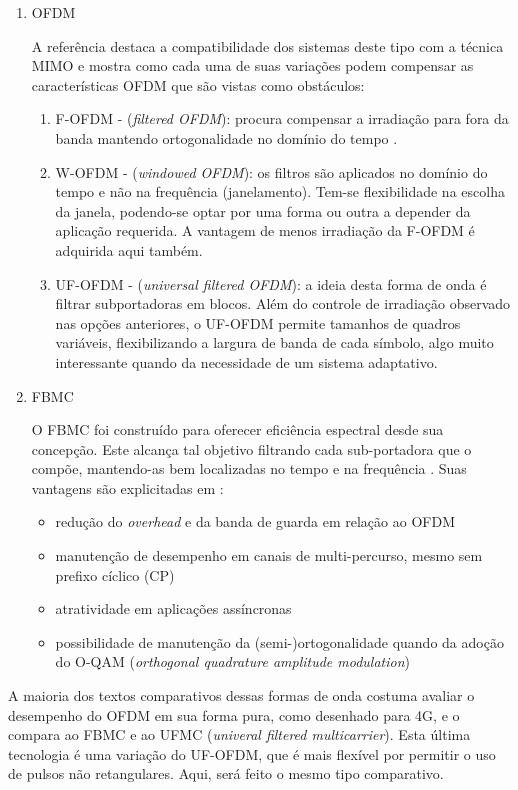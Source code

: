 \begin{enumerate}
\item{OFDM}
\par A referência \cite{Maziar} destaca a compatibilidade dos sistemas deste tipo com a técnica MIMO e mostra como cada uma de suas variações podem compensar as características OFDM que são vistas como obstáculos:
\begin{enumerate}
\item{F-OFDM} - (\textit{filtered OFDM}): procura compensar a irradiação para fora da banda mantendo ortogonalidade no domínio do tempo \cite{AbdoliJ}.
\item{W-OFDM} - (\textit{windowed OFDM}): os filtros são aplicados no domínio do tempo e não na frequência (janelamento). Tem-se flexibilidade na escolha da janela, podendo-se optar por uma forma ou outra a depender da aplicação requerida. A vantagem de menos irradiação da F-OFDM é adquirida aqui também. \cite{Maziar}
\item{UF-OFDM} - (\textit{universal filtered OFDM}): a ideia desta forma de onda é filtrar subportadoras em blocos. Além do controle de irradiação observado nas opções anteriores, o UF-OFDM permite tamanhos de quadros variáveis, flexibilizando a largura de banda de cada símbolo, algo muito interessante quando da necessidade de um sistema adaptativo. \cite{Maziar}
\end{enumerate}

\item{FBMC}
\par O FBMC foi construído para oferecer eficiência espectral desde sua concepção. Este alcança tal objetivo filtrando cada sub-portadora que o compõe, mantendo-as bem localizadas no tempo e na frequência \cite{Bellanger}. Suas vantagens são explicitadas em \cite{Maziar}: 
\begin{itemize}
\item redução do \textit{overhead} e da banda de guarda em relação ao OFDM
\item manutenção de desempenho em canais de multi-percurso, mesmo sem prefixo cíclico (CP)
\item atratividade em aplicações assíncronas 
\item possibilidade de manutenção da (semi-)ortogonalidade quando da adoção do O-QAM (\textit{orthogonal quadrature amplitude modulation}) 
\end{itemize}
\end{enumerate}

A maioria dos textos comparativos dessas formas de onda costuma avaliar o desempenho do OFDM em sua forma pura, como desenhado para 4G, e o compara ao FBMC e ao UFMC (\textit{univeral filtered multicarrier}). Esta última tecnologia é uma variação do UF-OFDM, que é mais flexível por permitir o uso de pulsos não retangulares. Aqui, será feito o mesmo tipo comparativo.


